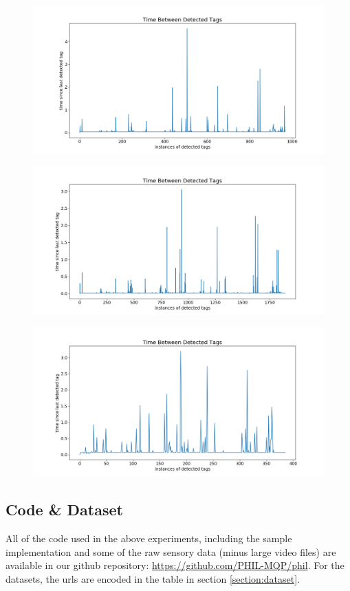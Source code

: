 \documentclass{article}
\begin{document}
    \begin{figure}[H]
      \centering
      \includegraphics[width=1\linewidth]{./images/detection_times_480p30.png}
    \end{figure}
    \begin{figure}[H]
      \centering
      \includegraphics[width=1\linewidth]{./images/detection_times_480p60.png}
    \end{figure}
    \begin{figure}[H]
      \centering
      \includegraphics[width=1\linewidth]{./images/detection_times_1080p15.png}
    \end{figure}

  \subsection{Code \& Dataset}\label{appendix:code}

    All of the code used in the above experiments, including the sample implementation and some of the raw sensory data (minus large video files) are available in our github repository: \url{https://github.com/PHIL-MQP/phil}. For the datasets, the urls are encoded in the table in section \ref{section:dataset}.
\end{document}
